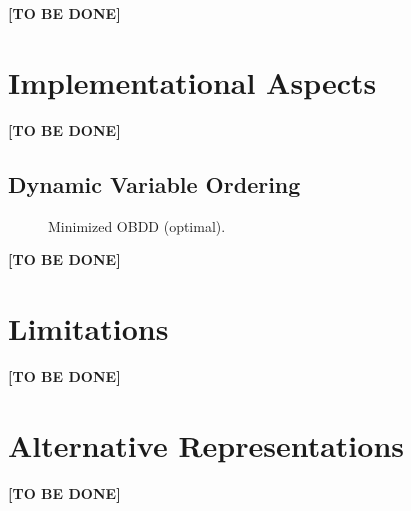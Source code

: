 \documentclass{vldb}
\newcommand{\tbd}{\textbf{[TO BE DONE]}}
\begin{document}
\tbd

\section{Implementational Aspects}
\label{sec:implementational-aspects}

\tbd

\subsection{Dynamic Variable Ordering}
\label{subsec:dynamic-variable-ordering}

\begin{figure}[ht]
    \centering
    
    \label{fig:min-obdd}
    \caption{Minimized OBDD (optimal).}
\end{figure}
\tbd

\section{Limitations}
\label{sec:limitations}

\tbd

\section{Alternative Representations}
\label{sec:alternative-representations}

\tbd

\balance



\end{document}
